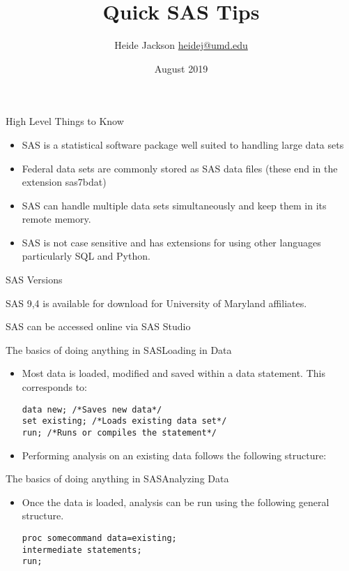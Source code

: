 \documentclass{beamer}
\title{Quick SAS Tips}
\author{\texorpdfstring{Heide Jackson \newline\url{heidej@umd.edu}}{Author}}
\institute{University of Maryland Population Research Center}
\date{August 2019}
\begin{document}
\maketitle
\begin{frame}{High Level Things to Know}
\begin{itemize}
\item SAS is a statistical software package well suited to handling large data sets
\item Federal data sets are commonly stored as SAS data files (these end in the extension sas7bdat)
\item SAS can handle multiple data sets simultaneously and keep them in its remote memory.
\item SAS is not case sensitive and has extensions for using other languages particularly SQL and Python.
\end{itemize}
\end{frame}


\begin{frame}{SAS Versions}

\item SAS 9,4 is available for download for University of Maryland affiliates.
\item SAS can be accessed online via SAS Studio

\end{frame}

\begin{frame}[fragile]{The basics of doing anything in SAS}{Loading in Data}
\begin{itemize}
\item Most data is loaded, modified and saved within a data statement.  This corresponds to: 
\begin{verbatim}
data new; /*Saves new data*/
set existing; /*Loads existing data set*/
run; /*Runs or compiles the statement*/
\end{verbatim}
\item Performing analysis on an existing data follows the following structure:
\end{itemize}
\end{frame}


\begin{frame}[fragile]{The basics of doing anything in SAS}{Analyzing Data}
\begin{itemize}
\item Once the data is loaded, analysis can be run using the following general structure.
\begin{verbatim}
proc somecommand data=existing;
intermediate statements;
run;
\end{verbatim}
\end{itemize}
\end{frame}
\end{document}
